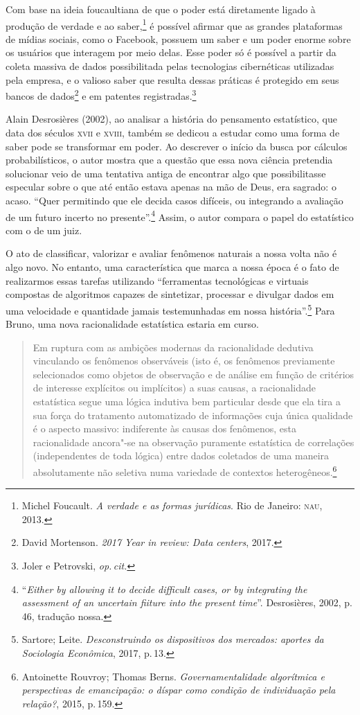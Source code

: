 Com base na ideia foucaultiana de que o poder está diretamente ligado à
produção de verdade e ao saber,\footnote{Michel Foucault. \textit{A verdade e as formas jurídicas}. Rio de Janeiro: \textsc{nau}, 2013.}
é possível afirmar que as grandes plataformas de mídias sociais, como o
Facebook, possuem um saber e um poder enorme sobre os usuários que
interagem por meio delas. Esse poder só é possível a partir da coleta
massiva de dados possibilitada pelas tecnologias cibernéticas utilizadas
pela empresa, e o valioso saber que resulta dessas práticas é protegido
em seus bancos de dados\footnote{David Mortenson. \textit{2017 Year in review: Data centers}, 2017.} e em patentes registradas.\footnote{Joler e Petrovski, \textit{op.\,cit.}}

Alain Desrosières (2002), ao analisar a história do pensamento estatístico, que data dos séculos
\textsc{xvii} e \textsc{xviii}, também se dedicou a estudar como uma forma de saber pode
se transformar em poder. Ao descrever o início da busca por cálculos
probabilísticos, o autor mostra que a questão que essa nova ciência
pretendia solucionar veio de uma tentativa antiga de encontrar algo que
possibilitasse especular sobre o que até então estava apenas na mão de
Deus, era sagrado: o acaso. ``Quer permitindo que ele decida casos
difíceis, ou integrando a avaliação de um futuro incerto no
presente''.\footnote{``\textit{Either by allowing it to decide difficult cases,
  or by integrating the assessment of an uncertain fiiture into the
  present time}''. Desrosières, 2002, p.\,46, tradução nossa.} Assim, o autor compara o papel
do estatístico com o de um juiz.

O ato de classificar, valorizar e avaliar fenômenos naturais a nossa
volta não é algo novo. No entanto, uma característica que marca a nossa
época é o fato de realizarmos essas tarefas utilizando ``ferramentas
tecnológicas e virtuais compostas de algoritmos capazes de sintetizar,
processar e divulgar dados em uma velocidade e quantidade jamais
testemunhadas em nossa história''.\footnote{Sartore; Leite. \textit{Desconstruindo os
dispositivos dos mercados: aportes da Sociologia Econômica}, 2017, p.\,13.} Para Bruno, uma nova racionalidade estatística estaria em curso.

\begin{quote}
Em ruptura com as ambições modernas da racionalidade dedutiva vinculando
os fenômenos observáveis (isto é, os fenômenos previamente selecionados
como objetos de observação e de análise em função de critérios de
interesse explícitos ou implícitos) a suas causas, a racionalidade
estatística segue uma lógica indutiva bem particular desde que ela tira
a sua força do tratamento automatizado de informações cuja única
qualidade é o aspecto massivo: indiferente às causas dos fenômenos, esta
racionalidade ancora"-se na observação puramente estatística de
correlações (independentes de toda lógica) entre dados coletados de uma
maneira absolutamente não seletiva numa variedade de contextos
heterogêneos.\footnote{Antoinette Rouvroy; Thomas Berns. \textit{Governamentalidade
algorítmica e perspectivas de emancipação: o díspar como condição de
individuação pela relação?}, 2015, p.\,159.}
\end{quote}

